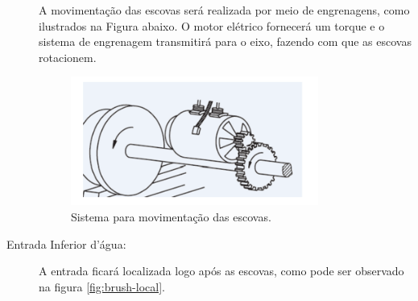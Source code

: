 \begin{description}
\FloatBarrier
\par
A movimentação das escovas será realizada por meio de engrenagens, como ilustrados
na Figura abaixo. O motor elétrico fornecerá um torque e o sistema de
engrenagem transmitirá para o eixo, fazendo com que as escovas rotacionem.
\par
\begin{figure}[h]
  \centering
  \includegraphics[width=0.8\textwidth]{figures/brush-system.png}
  \caption{Sistema para movimentação das escovas.}
  \label{fig:brush-system}
\end{figure}
\FloatBarrier

\item[Entrada Inferior d'água:] A entrada ficará localizada logo após as
escovas, como pode ser observado na figura \ref{fig:brush-local}.


\end{description}
